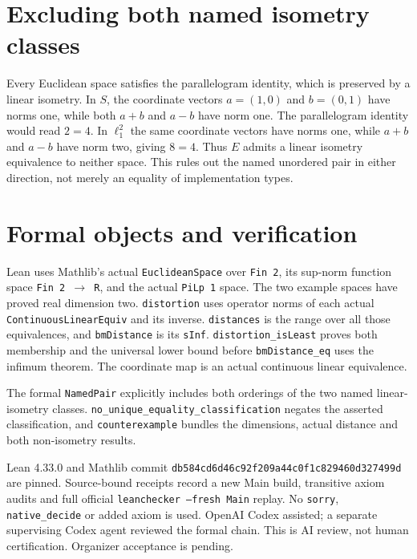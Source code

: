 \documentclass[11pt]{article}
\begin{document}
\section{Excluding both named isometry classes}
Every Euclidean space satisfies the parallelogram identity, which
is preserved by a linear isometry. In $S$, the coordinate vectors
$a=(1,0)$ and $b=(0,1)$ have norms one, while both $a+b$ and $a-b$
have norm one. The parallelogram identity would read $2=4$.
In $\ell_1^2$ the same coordinate vectors have norms one, while
$a+b$ and $a-b$ have norm two, giving $8=4$.
Thus $E$ admits a linear isometry equivalence to neither space.
This rules out the named unordered pair in either direction,
not merely an equality of implementation types.

\section{Formal objects and verification}
Lean uses Mathlib's actual \texttt{EuclideanSpace} over
\texttt{Fin 2}, its sup-norm function space \texttt{Fin 2 $\to$ R},
and the actual \texttt{PiLp 1} space. The two example spaces have
proved real dimension two. \texttt{distortion} uses operator norms
of each actual \texttt{ContinuousLinearEquiv} and its inverse.
\texttt{distances} is the range over all those equivalences, and
\texttt{bmDistance} is its \texttt{sInf}.
\texttt{distortion\_isLeast} proves both membership and the universal
lower bound before \texttt{bmDistance\_eq} uses the infimum theorem.
The coordinate map is an actual continuous linear equivalence.

The formal \texttt{NamedPair} explicitly includes both orderings
of the two named linear-isometry classes.
\texttt{no\_unique\_equality\_classification} negates the asserted
classification, and \texttt{counterexample} bundles the dimensions,
actual distance and both non-isometry results.

Lean 4.33.0 and Mathlib commit
\texttt{db584cd6d46c92f209a44c0f1c829460d327499d} are pinned.
Source-bound receipts record a new Main build, transitive axiom
audits and full official \texttt{leanchecker --fresh Main} replay.
No \texttt{sorry}, \texttt{native\_decide} or added axiom is used.
OpenAI Codex assisted; a separate supervising Codex agent reviewed
the formal chain. This is AI review, not human certification.
Organizer acceptance is pending.
\end{document}

